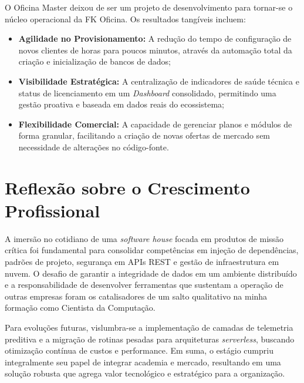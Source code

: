 O Oficina Master deixou de ser um projeto de desenvolvimento para tornar-se o núcleo operacional da FK Oficina. Os resultados tangíveis incluem:
\begin{itemize}
    \item \textbf{Agilidade no Provisionamento:} A redução do tempo de configuração de novos clientes de horas para poucos minutos, através da automação total da criação e inicialização de bancos de dados;
    \item \textbf{Visibilidade Estratégica:} A centralização de indicadores de saúde técnica e status de licenciamento em um \textit{Dashboard} consolidado, permitindo uma gestão proativa e baseada em dados reais do ecossistema;
    \item \textbf{Flexibilidade Comercial:} A capacidade de gerenciar planos e módulos de forma granular, facilitando a criação de novas ofertas de mercado sem necessidade de alterações no código-fonte.
\end{itemize}

\section{Reflexão sobre o Crescimento Profissional}

A imersão no cotidiano de uma \textit{software house} focada em produtos de missão crítica foi fundamental para consolidar competências em injeção de dependências, padrões de projeto, segurança em APIs REST e gestão de infraestrutura em nuvem. O desafio de garantir a integridade de dados em um ambiente distribuído e a responsabilidade de desenvolver ferramentas que sustentam a operação de outras empresas foram os catalisadores de um salto qualitativo na minha formação como Cientista da Computação.

Para evoluções futuras, vislumbra-se a implementação de camadas de telemetria preditiva e a migração de rotinas pesadas para arquiteturas \textit{serverless}, buscando otimização contínua de custos e performance. Em suma, o estágio cumpriu integralmente seu papel de integrar academia e mercado, resultando em uma solução robusta que agrega valor tecnológico e estratégico para a organização.
